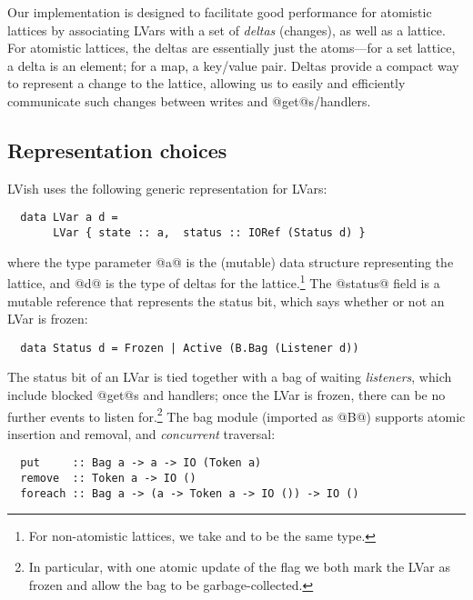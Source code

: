 Our implementation is designed to facilitate good performance for
atomistic lattices by associating LVars with a set of \emph{deltas}
(changes), as well as a lattice.  For atomistic lattices, the deltas
are essentially just the atoms---for a set lattice, a delta is an
element; for a map, a key/value pair.  Deltas provide a compact way to
represent a change to the lattice, allowing us to easily and
efficiently communicate such changes between writes and
@get@s/handlers.


\subsection{Representation choices}

LVish uses the following generic representation for LVars:

\singlespacing
\begin{lstlisting}
  data LVar a d = 
       LVar { state :: a,  status :: IORef (Status d) }
\end{lstlisting}
\doublespacing

where the type parameter @a@ is the (mutable) data structure
representing the lattice, and @d@ is the type of deltas for the
lattice.\footnote{For non-atomistic lattices, we take  and
   to be the same type.}  The @status@ field is a mutable
reference that represents the status bit, which says whether or not an
LVar is frozen:

\singlespacing
\begin{lstlisting}
  data Status d = Frozen | Active (B.Bag (Listener d))
\end{lstlisting}
\doublespacing

The status bit of an LVar is tied together with a bag of waiting
\emph{listeners}, which include blocked @get@s and handlers; once the
LVar is frozen, there can be no further events to listen
for.\footnote{In particular, with one atomic update of the flag we
  both mark the LVar as frozen and allow the bag to be
  garbage-collected.}  The bag module (imported as @B@) supports
atomic insertion and removal, and \emph{concurrent} traversal:

\singlespacing
\begin{lstlisting}
  put     :: Bag a -> a -> IO (Token a)
  remove  :: Token a -> IO ()
  foreach :: Bag a -> (a -> Token a -> IO ()) -> IO ()
\end{lstlisting}
\doublespacing


